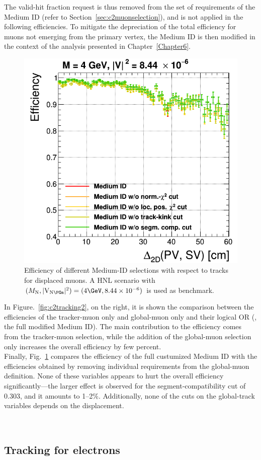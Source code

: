 The valid-hit fraction request is thus removed from the set of
requirements of the Medium ID (refer to Section~\ref{sec:c2muonselection}), and is not applied in the following
efficiencies. To mitigate the depreciation of the
total efficiency for muons not emerging from the primary vertex, the
Medium ID is then modified in the context of the analysis presented in
Chapter~\ref{Chapter6}.
\begin{figure}
\includegraphics[width=.40\textwidth]{Figures/c6/object/globalTrack_cuts_M-4_V-0p00290516780927_rho.png}
  \caption{Efficiency of different Medium-ID selections with respect to tracks for displaced
muons. A HNL scenario with
    $(\mhnl,\mixparm)=(4\GeV,8.44\times10^{-6})$ is used as
    benchmark. \dani}
  \label{fig:c2tracking3}
\end{figure}
In Figure.~\ref{fig:c2tracking2}, on the
right, it is shown the comparison between the efficiencies of the
tracker-muon only and global-muon only and their logical OR (\ie, the full
modified Medium ID). The main contribution to the efficiency comes
from the tracker-muon selection, while the addition of the global-muon
selection only increases the overall efficiency by few percent.\\
Finally, Fig.~\ref{fig:c2tracking3} compares the efficiency of
the full custumized Medium ID with the efficiencies obtained by removing
individual requirements from the global-muon definition. None of these variables
appears to hurt the overall efficiency significantly---the larger
effect is observed for the segment-compatibility cut of 0.303, and it
amounts to 1--2\%. Additionally, none of the cuts on the global-track
variables depends on the displacement.









~\cite{CMS-DP-2015-015}
\clearpage
\subsection{Tracking for electrons}\label{sec:trackele}



